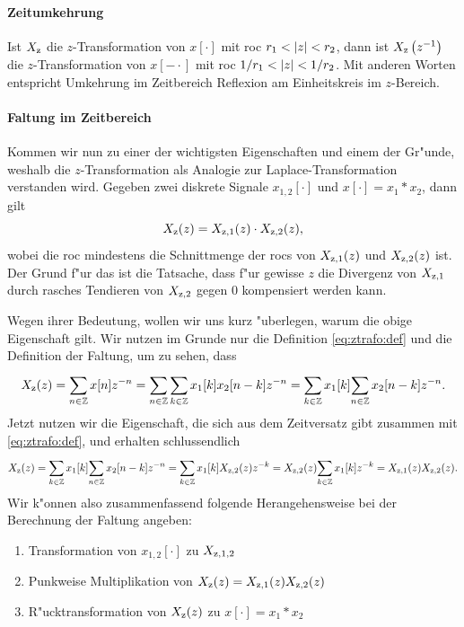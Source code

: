 \paragraph{Zeitumkehrung}
Ist $X_{\rm z}$ die $z$-Transformation von $x[\cdot]$ mit \gls{roc} $r_1 < {\left| z \right|} < r_2$, dann ist $X_{{\rm z}}\left(z^{-1}\right)$ die $z$-Transformation von $x[-\cdot]$ mit \gls{roc} $1/r_1 < {\left| z \right|} < 1/r_2$.
Mit anderen Worten entspricht Umkehrung im Zeitbereich Reflexion am Einheitskreis im $z$-Bereich.
%
\paragraph{Faltung im Zeitbereich}
%
Kommen wir nun zu einer der wichtigsten Eigenschaften und einem der Gr"unde, weshalb die $z$-Transformation als Analogie zur Laplace-Transformation verstanden wird.
Gegeben zwei diskrete Signale $x_{1,2}[\cdot]$ und $x[\cdot] = x_1 \ast x_2$, dann gilt 
\begin{equation}\label{eq:ztrafo:conv}
    X_{{\rm z}}(z) = X_{{\rm z},1}(z) \cdot X_{{\rm z},2}(z),
\end{equation}
wobei die \gls{roc} mindestens die Schnittmenge der \glspl{roc} von $X_{{\rm z},1}(z)$ und $X_{{\rm z},2}(z)$ ist.
Der Grund f"ur das  ist die Tatsache, dass f"ur gewisse $z$ die Divergenz von $X_{{\rm z},1}$ durch rasches Tendieren von $X_{{\rm z},2}$ gegen $0$ kompensiert werden kann.

Wegen ihrer Bedeutung, wollen wir uns kurz "uberlegen, warum die obige Eigenschaft gilt.
Wir nutzen im Grunde nur die Definition \eqref{eq:ztrafo:def} und die Definition der Faltung, um zu sehen, dass
\[
X_{\rm z}(z) 
    = {\sum\limits_{n \in \mathbb{Z}}^{}{x[n] z^{-n}}} 
    = {\sum\limits_{n \in \mathbb{Z}}^{}{
        {\sum\limits_{k \in \mathbb{Z}}^{}{x_1[k] x_2[n - k]}} z^{-n}
      }} 
    = {\sum\limits_{k \in \mathbb{Z}}^{}{
        x_1[k] {\sum\limits_{n \in \mathbb{Z}}^{}{x_2[n - k]}} z^{-n}
    }}.
\]
Jetzt nutzen wir die Eigenschaft, die sich aus dem Zeitversatz gibt zusammen mit \eqref{eq:ztrafo:def}, und erhalten schlussendlich
\[
    X_{\rm z}(z) 
    = {\sum\limits_{k \in \mathbb{Z}}^{}{
        x_1[k] {\sum\limits_{n \in \mathbb{Z}}^{}{x_2[n - k]}} z^{-n}
    }} 
    = {\sum\limits_{k \in \mathbb{Z}}^{}{
        x_1[k] X_{{\rm z}, 2}(z) z^{-k}
    }}
    = X_{{\rm z}, 2}(z) {\sum\limits_{k \in \mathbb{Z}}^{}{
        x_1[k] z^{-k}
    }}
    = X_{{\rm z},1}(z) X_{{\rm z}, 2}(z).
\]
Wir k"onnen also zusammenfassend folgende Herangehensweise bei der Berechnung der Faltung angeben:
\begin{enumerate}
    \item Transformation von $x_{1,2}[\cdot]$ zu $X_{{\rm z},1,2}$
    \item Punkweise Multiplikation von $X_{{\rm z}}(z) = X_{{\rm z},1}(z) X_{{\rm z},2}(z)$
    \item R"ucktransformation von $X_{{\rm z}}(z)$ zu $x[\cdot] = x_1 \ast x_2$
\end{enumerate}
%
